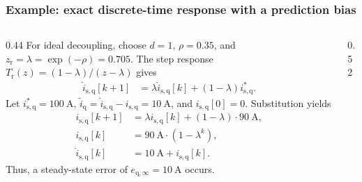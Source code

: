 \begin{frame}
    \frametitle{Example: exact discrete-time response with a prediction bias}
    \begin{columns}[c,onlytextwidth]
        \begin{column}{0.44\textwidth}
            \small
            For ideal decoupling, choose $d=1$, $\rho=0.35$, and
            $z_{\mathrm{r}}=\lambda=\exp(-\rho)=0.705$. The step response
            $T_{\mathrm{r}}(z)=(1-\lambda)/(z-\lambda)$ gives
            \begin{align*}
                \hat{i}_{\mathrm{s,q}}[k+1]
                 & =\lambda\hat{i}_{\mathrm{s,q}}[k]
                +(1-\lambda)i_{\mathrm{s,q}}^{*}.
            \end{align*}\pause%
            Let $i_{\mathrm{s,q}}^{*}=\SI{100}{\ampere}$,
            $\widetilde{i}_{\mathrm{q}}=\hat{i}_{\mathrm{s,q}}-i_{\mathrm{s,q}}
                =\SI{10}{\ampere}$, and $i_{\mathrm{s,q}}[0]=0$. Substitution yields
            \begin{align*}
                i_{\mathrm{s,q}}[k+1]
                 & =\lambda i_{\mathrm{s,q}}[k]
                +(1-\lambda)\cdot\SI{90}{\ampere},        \\
                i_{\mathrm{s,q}}[k]
                 & =\SI{90}{\ampere}\cdot(1-\lambda^k),   \\
                \hat{i}_{\mathrm{s,q}}[k]
                 & =\SI{10}{\ampere}+i_{\mathrm{s,q}}[k].
            \end{align*}\pause%
            Thus, a steady-state error of $e_{\mathrm{q},\infty}=\SI{10}{\ampere}$ occurs.
        \end{column}
        \begin{column}{0.52\textwidth}
            \centering
\end{column}
\end{columns}
\end{frame}
